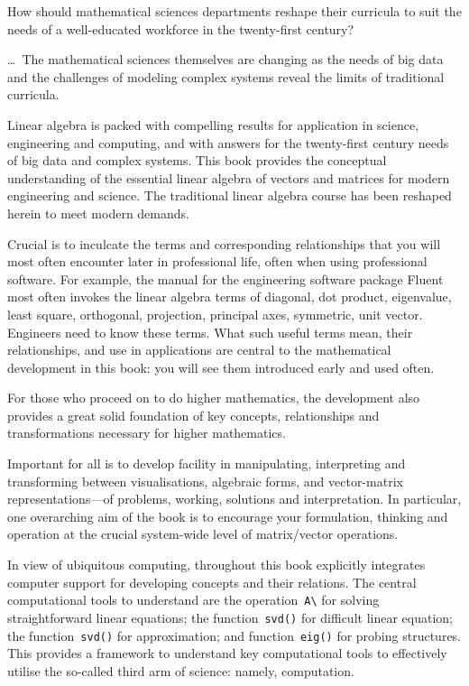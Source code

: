 \begin{quoted}{\cite{Bressoud2014}}
How should mathematical sciences departments reshape their curricula to suit the needs of a well-educated workforce in the twenty-first century?

\ldots\
The mathematical sciences themselves are changing as the needs of big data and the challenges of modeling complex systems reveal the limits of traditional curricula.
%
\end{quoted}



Linear algebra is packed with compelling results for application in science, engineering and computing, and with answers for the twenty-first century needs of big data and complex systems.
This book provides the conceptual understanding of the essential linear algebra of vectors and matrices for modern engineering and science.
The traditional linear algebra course has been reshaped herein to meet modern demands.

Crucial is to inculcate the terms and corresponding relationships that you will most often encounter later in professional life, often when using professional software.  
For example, the manual for the engineering software package Fluent most often invokes the linear algebra terms of diagonal, dot product, eigenvalue, least square, orthogonal, projection, principal axes, symmetric, unit vector.
Engineers need to know these terms.
What such useful terms mean, their relationships, and use in applications are central to the mathematical development in this book: you will see them introduced early and used often.

For those who proceed on to do higher mathematics, the development also provides a great solid foundation of key concepts, relationships and transformations necessary for higher mathematics. 

Important for all is to develop facility in manipulating, interpreting and transforming between visualisations, algebraic forms, and vector-matrix representations---of problems, working, solutions and interpretation.
In particular, one overarching aim of the book is to encourage your formulation, thinking and operation at the crucial system-wide level of matrix\slash vector operations.

In view of ubiquitous computing, throughout this book explicitly integrates computer support for developing concepts and their relations.
The central computational tools to understand are the operation~\verb|A\| for solving straightforward linear equations; the function~\verb|svd()| for difficult linear equation; the function~\verb|svd()| for approximation; and function~\verb|eig()| for probing structures.
This provides a framework to understand key computational tools to effectively utilise the so-called third arm of science: namely, computation. 

